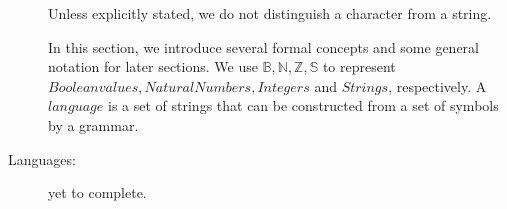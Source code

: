 \begin{description}
           	
           	
           	
           	
           	
           	
	Unless explicitly stated, we do not distinguish a character from a string.
	
	In this section, we introduce several formal concepts and some general notation for later sections. We use \(\mathbb B, \mathbb N, \mathbb Z, \mathbb S\) to represent \(Boolean values, Natural Numbers, Integers\)  and  \(Strings\), respectively. A \(language\) is a set of strings that can be constructed from a set of symbols by a grammar.
	
	\item[Languages: ] yet to complete.
\end{description}
